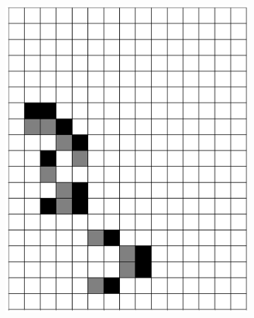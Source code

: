 \documentclass[12pt]{article}
\numberwithin{figure}{section} %
\begin{document}
\begin{figure}[H]
   \begin{subfigure}{0.3\textwidth}
     \centering
     \includegraphics[width=\linewidth]{Section4/29.3}
     \subcaption{}
   \end{subfigure}
     \begin{subfigure}{0.3\textwidth}
     \centering

\end{subfigure}
\end{figure}
\end{document}
